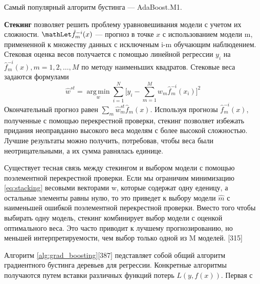 Самый популярный алгоритм бустинга --- AdaBoost.M1.

\textbf{Стекинг} позволяет решить проблему уравновешивания
модели с учетом их сложности. 
$\mathLet \hat{f}_m^{-i}(x)$ --- прогноз в точке $x$ с использованием модели m, примененной к множеству данных с исключеным i-m обучающим наблюдением. Стековая оценка весов получается с помощью линейной регрессии $y_i$ на $\hat{f}_m^{-i}(x), m = 1, 2, \dots, M$ по методу наименьших квадратов. Стековые веса задаются формулами 
\begin{equation}
    \hat{w}^{st} = \operatorname*{arg\,min}_{w}\sum_{i=1}^N\biggl[y_i-\sum_{m=1}^Mw_m\hat{f}_m^{-i}(x_i)\biggr]^2\label{eq:stacking}
\end{equation}
Окончательный прогноз равен $\sum_m\hat{w}_m^{st}\hat{f}_m(x)$. Используя прогнозы $\hat{f}_m^{-i}(x)$, полученные с помощью перекрестной проверки, стекинг позволяет избежать придания неоправданно высокого веса моделям с более высокой сложностью. Лучшие результаты можно получить, потребовав, чтобы веса были неотрицательными, а их сумма равнялась единице.

Существует тесная связь между стекингом и выбором модели с помощью поэлементной перекрестной проверки. Если мы ограничим минимизацию \ref{eq:stacking} весовыми векторами w, которые содержат одну еденицу, а остальные элементы равны нулю, то это приведет к выбору модели $\hat{m}$ с наименьшей ошибкой поэлементной перекрестной проверки. Вместо того чтобы выбирать одну модель, стекинг комбинирует выбор модели с оценкой оптимального веса. Это часто приводит к лучшему прогнозированию, но меньшей интерпретируемости, чем выбор только одной из M моделей. [315]


Алгоритм \ref{alg:grad_boosting}[387] педставляет собой общий алгоритм градиентного бустинга деревьев для регрессии. Конкретные алгоритмы получаются путем вставки различных функций потерь $L(y, f(x))$. Первая с


